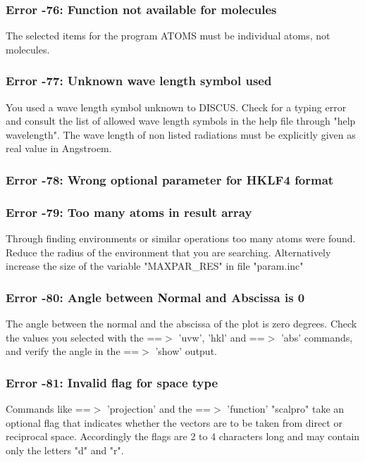 \subsubsection{Error -76: Function not available for molecules}
\par
The selected items for the program ATOMS must be individual atoms, 
not molecules. 
\subsubsection{Error -77: Unknown wave length symbol used}
\par
You used a wave length symbol unknown to DISCUS. Check for a typing 
error and consult the list of allowed wave length symbols in the help 
file through "help wavelength". The wave length of non listed radiations 
must be explicitly given as real value in Angstroem. 
\subsubsection{Error -78: Wrong optional parameter for HKLF4 format}
\subsubsection{Error -79: Too many atoms in result array}
\par
Through finding environments or similar operations too many atoms 
were found. Reduce the radius of the environment that you are searching. 
Alternatively increase the size of the variable "MAXPAR\_RES" in file 
"param.inc" 
\subsubsection{Error -80: Angle between Normal and Abscissa is 0}
\par
The angle between the normal and the abscissa of the plot is 
zero degrees. Check the values you selected with the ==$> $ 'uvw', 'hkl' 
and ==$> $ 'abs' commands, and verify the angle in the ==$> $ 'show' 
output. 
\subsubsection{Error -81: Invalid flag for space type}
\par
Commands like ==$> $ 'projection' and the ==$> $ 'function' "scalpro" take 
an optional flag that indicates whether the vectors are to be taken 
from direct or reciprocal space. Accordingly the flags are 2 to 4 
characters long and may contain only the letters "d" and "r". 

